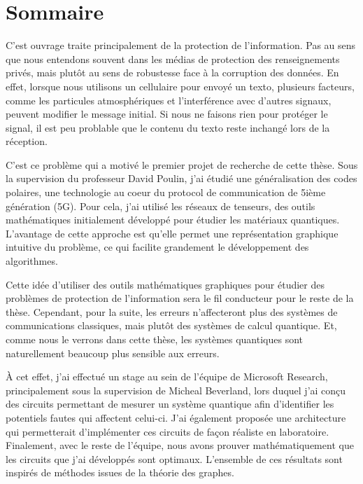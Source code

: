 \begin{comment}
\end{comment}

\clearpage  %
\chapter*{Sommaire}

C'est ouvrage traite principalement de la protection de
l'information. 
Pas au sens que nous entendons souvent dans les médias de protection des renseignements privés,
mais plutôt au sens de robustesse face à la corruption des données.
En effet,
lorsque nous utilisons un cellulaire pour envoyé un texto,
plusieurs facteurs, 
comme les particules atmosphériques et l'interférence avec d'autres signaux,
peuvent modifier le message initial.
Si nous ne faisons rien pour protéger le signal,
il est peu problable que le contenu du texto reste inchangé
lors de la réception.

C'est ce problème qui a motivé le premier projet 
de recherche de cette thèse.
Sous la supervision du professeur David Poulin,
j'ai étudié une généralisation des codes polaires,
une technologie au coeur du protocol de communication de 5ième génération (5G).
Pour cela,
j'ai utilisé les réseaux de tenseurs, 
des outils mathématiques initialement développé pour étudier
les matériaux quantiques.
L'avantage de cette approche est qu'elle permet une représentation
graphique intuitive du problème, 
ce qui facilite grandement le développement des algorithmes.

Cette idée d'utiliser des outils mathématiques graphiques pour 
étudier des problèmes de protection de l'information
sera le fil conducteur pour le reste de la thèse.
Cependant, 
pour la suite, 
les erreurs n'affecteront plus des systèmes de communications classiques,
mais plutôt des systèmes de calcul quantique.
Et, comme nous le verrons dans cette thèse,
les systèmes quantiques sont naturellement beaucoup plus sensible aux erreurs.

À cet effet, 
j'ai effectué un stage au sein de l'équipe de Microsoft Research,
principalement sous la supervision de Micheal Beverland, 
lors duquel j'ai conçu des circuits permettant de mesurer un système quantique afin d'identifier
les potentiels fautes qui affectent celui-ci.
J'ai également proposée une architecture qui permetterait d'implémenter ces circuits
de façon réaliste en laboratoire.
Finalement, avec le reste de l'équipe, 
nous avons prouver mathématiquement que les circuits que j'ai développés sont optimaux.
L'ensemble de ces résultats sont inspirés de méthodes issues de la théorie des graphes.

